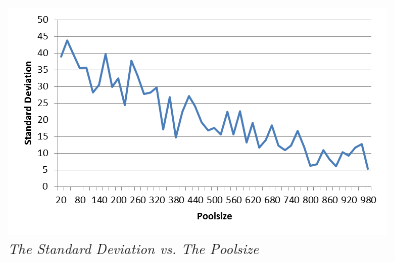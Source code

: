 \begin{figure}[h] 
	\centering
	\includegraphics[height=6cm]{SDP}
	\caption{\textsl{The Standard Deviation vs. The Poolsize}}
	\label{SDP}
\end{figure}


